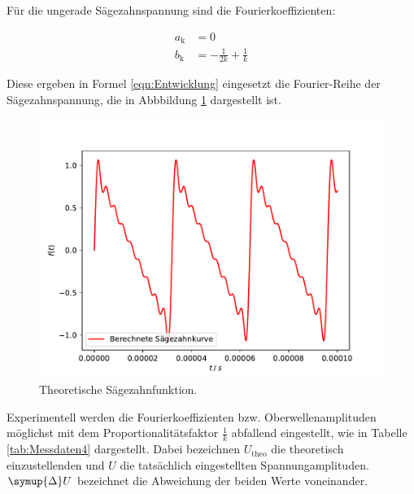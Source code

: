Für die ungerade Sägezahnspannung sind die Fourierkoeffizienten:

\begin{align*}
    a_\text{k} &= 0 \\
    b_\text{k} &= - \frac{1}{2k} + \frac{1}{k}
\end{align*}

Diese ergeben in Formel \eqref{eqn:Entwicklung} eingesetzt die Fourier-Reihe
der Sägezahnspannung, die in Abbbildung \ref{fig:Theo1} dargestellt ist.

\begin{figure}[H]
    \centering
    \includegraphics[scale = 0.6]{content/plot4.pdf}
    \caption{Theoretische Sägezahnfunktion.}
    \label{fig:Theo1}
\end{figure}

Experimentell werden die Fourierkoeffizienten bzw. Oberwellenamplituden möglichst mit dem
Proportionalitätsfaktor $\frac{1}{k}$ abfallend eingestellt, wie in Tabelle \ref{tab:Messdaten4}
dargestellt. Dabei bezeichnen $U_\text{theo}$ die theoretisch einzustellenden und $U$ die
tatsächlich eingestellten Spannungamplituden. $\symup{\Delta}U$ bezeichnet die Abweichung der
beiden Werte voneinander.

